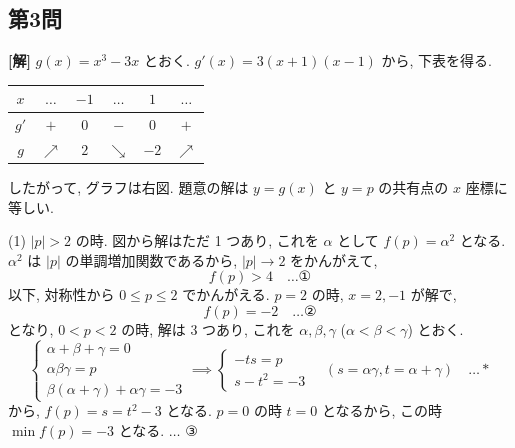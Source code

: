 \documentclass[../main.tex]{subfiles}
\begin{document}
\newpage

\subsection*{第3問}

\noindent
\textbf{[解]} $g(x) = x^3 - 3x$ とおく. $g'(x) = 3(x+1)(x-1)$ から, 下表を得る.

\begin{center}
  \begin{tabular}{c|c|c|c|c|c}
    $x$ & $\dots$ & $-1$ & $\dots$ & $1$ & $\dots$ \\ \hline
    $g'$ & $+$ & $0$ & $-$ & $0$ & $+$ \\ \hline
    $g$ & $\nearrow$ & $2$ & $\searrow$ & $-2$ & $\nearrow$
  \end{tabular}
\end{center}

\noindent
したがって, グラフは右図. 題意の解は $y = g(x)$ と $y = p$ の共有点の $x$ 座標に等しい.

\begin{center}
\end{center}

\noindent
(1) $|p| > 2$ の時. 図から解はただ 1 つあり, これを $\alpha$ として $f(p) = \alpha^2$ となる. $\alpha^2$ は $|p|$ の単調増加関数であるから, $|p| \to 2$ をかんがえて,
\[
  f(p) > 4 \quad \dots \text{①}
\]
以下, 対称性から $0 \le p \le 2$ でかんがえる. $p = 2$ の時, $x = 2, -1$ が解で,
\[
  f(p) = -2 \quad \dots \text{②}
\]
となり, $0 < p < 2$ の時, 解は 3 つあり, これを $\alpha, \beta, \gamma$ ($\alpha < \beta < \gamma$) とおく.
\[
  \begin{cases}
    \alpha + \beta + \gamma = 0 \\
    \alpha \beta \gamma = p \\
    \beta(\alpha + \gamma) + \alpha \gamma = -3
  \end{cases}
  \implies
  \begin{cases}
    -t s = p \\
    s - t^2 = -3
  \end{cases}
  \quad (s = \alpha \gamma, t = \alpha + \gamma) \quad \dots *
\]
から, $f(p) = s = t^2 - 3$ となる. $p = 0$ の時 $t = 0$ となるから, この時 $\min f(p) = -3$ となる. \hfill $\dots$ ③
\end{document}
